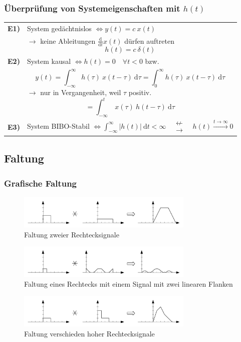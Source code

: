 \documentclass[10pt,a4paper]{article}
\begin{document}
\subsubsection*{Überprüfung von Systemeigenschaften mit $h(t)$}
\begin{tabular}{l p{12cm}}
	\textbf{E1)} & System gedächtnislos $\Longleftrightarrow y(t) = c~x(t)$\\ & $\rightarrow$ keine Ableitungen $\frac{\mathrm d}{\mathrm dt}x(t)$ dürfen auftreten \[h(t)=c~\delta(t)\]\\
	\textbf{E2)} & System kausal $\Longleftrightarrow h(t)=0 \quad \forall t<0$ bzw.\\ & \[y(t)=\int_{-\infty}^{\infty}h(\tau) ~ x(t-\tau) ~ \mathrm d\tau = \int_{0}^{\infty} h(\tau) ~ x(t-\tau) ~ \mathrm d\tau\] $\rightarrow$ nur in Vergangenheit, weil $\tau$ positiv.
	\[=\int_{-\infty}^{t} ~ x(\tau) ~ h(t-\tau) ~ \mathrm d\tau\] \\
	\textbf{E3)} & System BIBO-Stabil $\Longleftrightarrow \int_{-\infty}^{\infty} |h(t)| ~ \mathrm dt < \infty \quad \substack{\nleftarrow\\[-1em] \rightarrow}\quad h(t)\overset{t\rightarrow\infty}{\longrightarrow}0$
\end{tabular}
\subsection*{Faltung}
\subsubsection*{Grafische Faltung}
\begin{figure}[H]
	\centering
	\includegraphics[width=0.75\textwidth]{img/faltung1.pdf}
	\caption*{Faltung zweier Rechtecksignale}
\end{figure}
\begin{figure}[H]
	\centering
	\includegraphics[width=0.75\textwidth]{img/faltung2.pdf}
	\caption*{Faltung eines Rechtecks mit einem Signal mit zwei linearen Flanken}
\end{figure}
\begin{figure}[H]
	\centering
	\includegraphics[width=0.75\textwidth]{img/faltung3.pdf}
	\caption*{Faltung verschieden hoher Rechtecksignale}
\end{figure}
\end{document}
